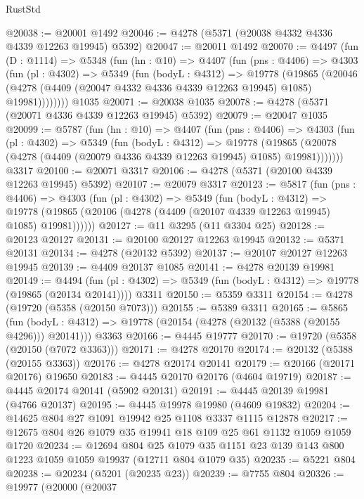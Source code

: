 \begin{lexlean}{RustStd}
\begin{coremodule}
@20038 := @20001 @1492
@20046 := @4278 (@5371 (@20038 @4332 @4336 @4339 @12263 @19945) @5392)
@20047 := @20011 @1492
@20070 := @4497
    (fun (D : @1114) =>
    @5348
      (fun (hn : @10) =>
      @4407
        (fun (pns : @4406) =>
        @4303
          (fun (pl : @4302) =>
          @5349
            (fun (bodyL : @4312) =>
            @19778
              (@19865
                (@20046 (@4278 (@4409 (@20047 @4332 @4336 @4339 @12263 @19945) @1085) @19981))))))))
    @1035
@20071 := @20038 @1035
@20078 := @4278 (@5371 (@20071 @4336 @4339 @12263 @19945) @5392)
@20079 := @20047 @1035
@20099 := @5787
    (fun (hn : @10) =>
    @4407
      (fun (pns : @4406) =>
      @4303
        (fun (pl : @4302) =>
        @5349
          (fun (bodyL : @4312) =>
          @19778
            (@19865 (@20078 (@4278 (@4409 (@20079 @4336 @4339 @12263 @19945) @1085) @19981)))))))
    @3317
@20100 := @20071 @3317
@20106 := @4278 (@5371 (@20100 @4339 @12263 @19945) @5392)
@20107 := @20079 @3317
@20123 := @5817
    (fun (pns : @4406) =>
    @4303
      (fun (pl : @4302) =>
      @5349
        (fun (bodyL : @4312) =>
        @19778 (@19865 (@20106 (@4278 (@4409 (@20107 @4339 @12263 @19945) @1085) @19981))))))
@20127 := @11 @3295 (@11 @3304 @25)
@20128 := @20123 @20127
@20131 := @20100 @20127 @12263 @19945
@20132 := @5371 @20131
@20134 := @4278 (@20132 @5392)
@20137 := @20107 @20127 @12263 @19945
@20139 := @4409 @20137 @1085
@20141 := @4278 @20139 @19981
@20149 := @4494
    (fun (pl : @4302) => @5349 (fun (bodyL : @4312) => @19778 (@19865 (@20134 @20141))))
    @3311
@20150 := @5359 @3311
@20154 := @4278 (@19720 (@5358 (@20150 @7073)))
@20155 := @5389 @3311
@20165 := @5865
    (fun (bodyL : @4312) => @19778 (@20154 (@4278 (@20132 (@5388 (@20155 @4296))) @20141)))
    @3363
@20166 := @4445 @19777
@20170 := @19720 (@5358 (@20150 (@7072 @3363)))
@20171 := @4278 @20170
@20174 := @20132 (@5388 (@20155 @3363))
@20176 := @4278 @20174 @20141
@20179 := @20166 (@20171 @20176) @19650
@20183 := @4445 @20170 @20176 (@4604 @19719)
@20187 := @4445 @20174 @20141 (@5902 @20131)
@20191 := @4445 @20139 @19981 (@4766 @20137)
@20195 := @4445 @19978 @19980 (@4609 @19832)
@20204 := @14625 @804 @27 @1091 @19942 @25 @1108 @3337 @1115 @12878
@20217 := @12675 @804 @26 @1079 @35 @19941 @18 @109 @25 @61 @1132 @1059 @1059 @1720
@20234 := @12694
    @804
    @25
    @1079
    @35
    @1151
    @23
    @139
    @143
    @800
    @1223
    @1059
    @1059
    @19937
    (@12711 @804 @1079 @35)
@20235 := @5221 @804
@20238 := @20234 (@5201 (@20235 @23))
@20239 := @7755 @804
@20326 := @19977
    (@20000
      (@20037

\end{coremodule}
\end{lexlean}

